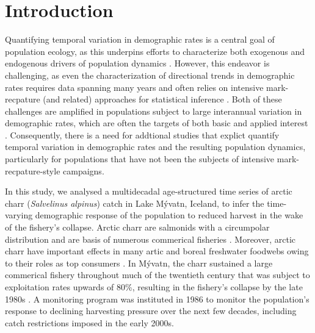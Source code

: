 \section*{Introduction}

Quantifying temporal variation in demographic rates is a central goal of population ecology,
as this underpins efforts to characterize both exogenous and endogenous drivers of population dynamics 
\citep{twombly1994comparative, zeng1998, koons2016life}.
However, this endeavor is challenging, 
as even the characterization of directional trends in demographic rates requires
data spanning many years and 
often relies on intensive mark-recpature (and related) approaches for statistical inference
\citep[e.g.,][]{forcada2008life, hunter2010climate}.
Both of these challenges are amplified in populations subject to large interannual variation
in demographic rates, 
which are often the targets of both basic and applied interest
\citep[e.g.,][]{white2007irruptive}.
Consequently, 
there is a need for addtional studies that 
explict quantify temporal variation in demographic rates 
and the resulting population dynamics, 
particularly for populations that have not been the subjects 
of intensive mark-recpature-style campaigns.

In this study, we analysed a multidecadal age-structured time series 
of arctic charr (\emph{Salvelinus alpinus}) catch  in Lake M\'{y}vatn, Iceland, 
to infer the time-varying demographic response of the population 
to reduced harvest in the wake of the fishery's collapse.
Arctic charr are salmonids with a circumpolar distribution
and are basis of numerous commerical fisheries \citep{klemetsen2003atlantic}.
Moreover,
arctic charr have important effects in many artic 
and boreal freshwater foodwebs owing to their roles as top consumers
\citep{jeppesen2001fish, klemetsen2003atlantic}.
In M\'{y}vatn, the charr sustained a large commerical fishery throughout much of the 
twentieth century that was subject to exploitation rates upwards of 80\%,
resulting in the fishery's collapse by the late 1980s \citep{gudbergsson2004}.
A monitoring program was instituted in 1986 to monitor the population's
response to declining harvesting pressure over the next few decades,
including catch restrictions imposed in the early 2000s.

